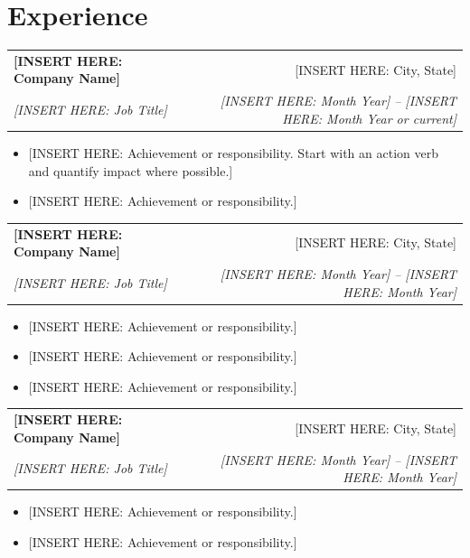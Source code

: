 \documentclass[letterpaper,10pt]{article}
\makeatletter
\newcommand{\resumeHeading}[4]{
    \begin{tabular*}{0.99\textwidth}[t]{l@{\extracolsep{\fill}}r}
      \textbf{#1} & #2 \\
      \textit{\small#3} & \textit{\small #4} \\
    \end{tabular*}\vspace{-5pt}
}
\newcommand{\resumeItemListStart}{\begin{itemize}}
\newcommand{\resumeItemListEnd}{\end{itemize}\vspace{-5pt}}
\makeatother
\begin{document}
\section{Experience}

  \resumeHeading
    {[INSERT HERE: Company Name]}{[INSERT HERE: City, State]}
    {[INSERT HERE: Job Title]}{[INSERT HERE: Month Year] -- [INSERT HERE: Month Year or current]}
  \resumeItemListStart
    \vspace{2pt}
    \item\small{[INSERT HERE: Achievement or responsibility. Start with an action verb and quantify impact where possible.]}
    \vspace{-4pt}
    \item\small{[INSERT HERE: Achievement or responsibility.]}
    \vspace{-4pt}
  \resumeItemListEnd

  \vspace{5pt}

  \resumeHeading
    {[INSERT HERE: Company Name]}{[INSERT HERE: City, State]}
    {[INSERT HERE: Job Title]}{[INSERT HERE: Month Year] -- [INSERT HERE: Month Year]}
  \resumeItemListStart
    \vspace{2pt}
    \item\small{[INSERT HERE: Achievement or responsibility.]}
    \vspace{-4pt}
    \item\small{[INSERT HERE: Achievement or responsibility.]}
    \vspace{-4pt}
    \item\small{[INSERT HERE: Achievement or responsibility.]}
    \vspace{-4pt}
  \resumeItemListEnd

  \vspace{5pt}

  \resumeHeading
    {[INSERT HERE: Company Name]}{[INSERT HERE: City, State]}
    {[INSERT HERE: Job Title]}{[INSERT HERE: Month Year] -- [INSERT HERE: Month Year]}
  \resumeItemListStart
    \vspace{2pt}
    \item\small{[INSERT HERE: Achievement or responsibility.]}
    \vspace{-4pt}
    \item\small{[INSERT HERE: Achievement or responsibility.]}
    \vspace{-4pt}
  \resumeItemListEnd
\end{document}
